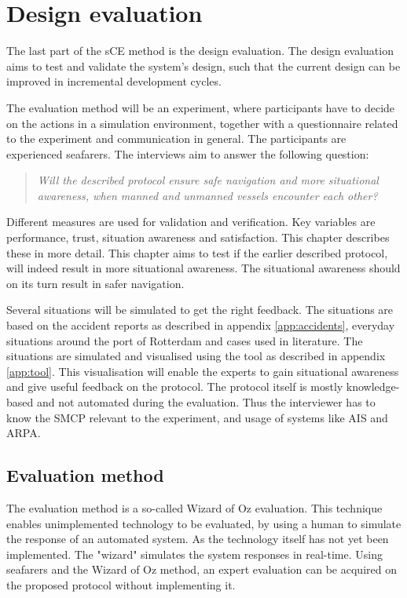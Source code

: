 \chapter{Design evaluation}
\label{ch:evaluation}
The last part of the sCE method is the design evaluation. The design evaluation aims to test and validate the system’s design, such that the current design can be improved in incremental development cycles. 

The evaluation method will be an experiment, where participants have to decide on the actions in a simulation environment, together with a questionnaire related to the experiment and communication in general. The participants are experienced seafarers. The interviews aim to answer the following question:
\begin{quotation}
	\emph{Will the described protocol ensure safe navigation and more situational awareness, when manned and unmanned vessels encounter each other?}
\end{quotation}
Different measures are used for validation and verification. Key variables are performance, trust, situation awareness and satisfaction. This chapter describes these in more detail. This chapter aims to test if the earlier described protocol, will indeed result in more situational awareness. The situational awareness should on its turn result in safer navigation.

Several situations will be simulated to get the right feedback. The situations are based on the accident reports as described in appendix \ref{app:accidents}, everyday situations around the port of Rotterdam and cases used in literature. The situations are simulated and visualised using the tool as described in appendix \ref{app:tool}. This visualisation will enable the experts to gain situational awareness and give useful feedback on the protocol. The protocol itself is mostly knowledge-based and not automated during the evaluation. Thus the interviewer has to know the \acf{SMCP} relevant to the experiment, and usage of systems like \acf{AIS} and \acf{ARPA}.

\section{Evaluation method}
The evaluation method is a so-called Wizard of Oz evaluation. This technique enables unimplemented technology to be evaluated, by using a human to simulate the response of an automated system. As the technology itself has not yet been implemented. The "wizard" simulates the system responses in real-time. Using seafarers and the Wizard of Oz method, an expert evaluation can be acquired on the proposed protocol without implementing it.


